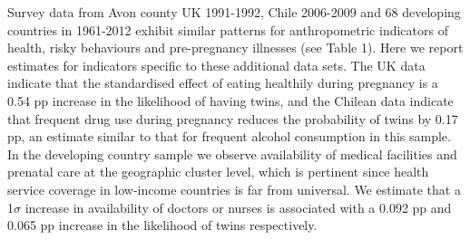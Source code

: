 \documentclass{nature}
\begin{document}
\begin{linenumbers}
Survey data from Avon county UK 1991-1992, Chile 2006-2009 and 68 developing countries in 1961-2012 exhibit similar patterns for anthropometric indicators of health, risky behaviours and pre-pregnancy illnesses (see Table 1). Here we report estimates for indicators specific to these additional data sets. %
The UK data indicate that the standardised effect of eating healthily during pregnancy is a 0.54 pp increase in the likelihood of having twins,
and the Chilean data indicate that frequent drug use during pregnancy reduces the probability of twins by 0.17 pp, an estimate similar to that for frequent alcohol consumption in this sample. In the developing country sample we observe availability of medical facilities and prenatal care at the geographic cluster level, which is pertinent since health service coverage in low-income countries is far from universal. We estimate that a 1$\sigma$ increase in  availability of doctors or nurses is associated with a 0.092 pp and 0.065 pp increase in the likelihood of twins respectively. %



\end{linenumbers}
\end{document}

